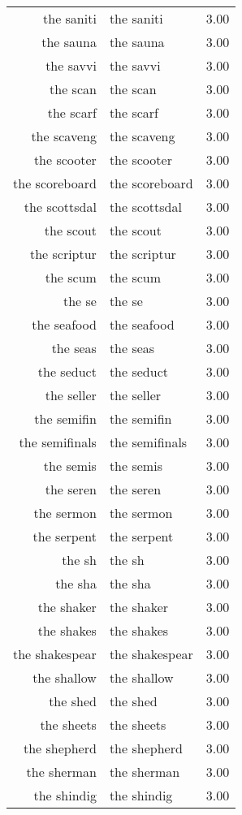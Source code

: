 \begin{table}[ht]
\begin{tabular}{rlr}
  the saniti & the saniti & 3.00 \\ 
  the sauna & the sauna & 3.00 \\ 
  the savvi & the savvi & 3.00 \\ 
  the scan & the scan & 3.00 \\ 
  the scarf & the scarf & 3.00 \\ 
  the scaveng & the scaveng & 3.00 \\ 
  the scooter & the scooter & 3.00 \\ 
  the scoreboard & the scoreboard & 3.00 \\ 
  the scottsdal & the scottsdal & 3.00 \\ 
  the scout & the scout & 3.00 \\ 
  the scriptur & the scriptur & 3.00 \\ 
  the scum & the scum & 3.00 \\ 
  the se & the se & 3.00 \\ 
  the seafood & the seafood & 3.00 \\ 
  the seas & the seas & 3.00 \\ 
  the seduct & the seduct & 3.00 \\ 
  the seller & the seller & 3.00 \\ 
  the semifin & the semifin & 3.00 \\ 
  the semifinals & the semifinals & 3.00 \\ 
  the semis & the semis & 3.00 \\ 
  the seren & the seren & 3.00 \\ 
  the sermon & the sermon & 3.00 \\ 
  the serpent & the serpent & 3.00 \\ 
  the sh & the sh & 3.00 \\ 
  the sha & the sha & 3.00 \\ 
  the shaker & the shaker & 3.00 \\ 
  the shakes & the shakes & 3.00 \\ 
  the shakespear & the shakespear & 3.00 \\ 
  the shallow & the shallow & 3.00 \\ 
  the shed & the shed & 3.00 \\ 
  the sheets & the sheets & 3.00 \\ 
  the shepherd & the shepherd & 3.00 \\ 
  the sherman & the sherman & 3.00 \\ 
  the shindig & the shindig & 3.00 \\ 

\end{tabular}
\end{table}
